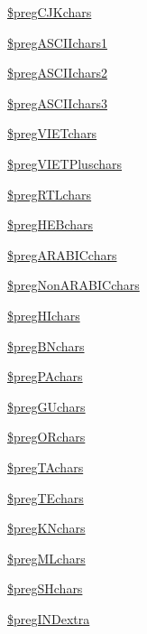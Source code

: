 \begin{DoxyCompactItemize}
\hyperlink{classm_p_d_f_ac612de0a9e3f753e072071b59564060c}{\$preg\-C\-J\-Kchars}
\item 
\hyperlink{classm_p_d_f_a505f6fdb4b2f3dd7b58fc97984fcf07e}{\$preg\-A\-S\-C\-I\-Ichars1}
\item 
\hyperlink{classm_p_d_f_ad6433b4ca18a546f1fc8b81b45e59f52}{\$preg\-A\-S\-C\-I\-Ichars2}
\item 
\hyperlink{classm_p_d_f_a6da10b526a0e13ce3439bac166fce23c}{\$preg\-A\-S\-C\-I\-Ichars3}
\item 
\hyperlink{classm_p_d_f_a6cf318b7bec85d2268f09fbd4222e107}{\$preg\-V\-I\-E\-Tchars}
\item 
\hyperlink{classm_p_d_f_a38bf80eadb48fa7ea55028c20def3a29}{\$preg\-V\-I\-E\-T\-Pluschars}
\item 
\hyperlink{classm_p_d_f_a26f3647a0abacee981fb62e9facd8f63}{\$preg\-R\-T\-Lchars}
\item 
\hyperlink{classm_p_d_f_ac0df801bf2bcd915649927ceb8107a61}{\$preg\-H\-E\-Bchars}
\item 
\hyperlink{classm_p_d_f_a33b7687be7b2c5ed6ce5f3d09b0d6605}{\$preg\-A\-R\-A\-B\-I\-Cchars}
\item 
\hyperlink{classm_p_d_f_ac88b8cf03e051527ee9b078f1c66b742}{\$preg\-Non\-A\-R\-A\-B\-I\-Cchars}
\item 
\hyperlink{classm_p_d_f_ac1139bb99f29c2911398885c2863c617}{\$preg\-H\-Ichars}
\item 
\hyperlink{classm_p_d_f_a2f44162e7ffe42defce961bcc0b123bf}{\$preg\-B\-Nchars}
\item 
\hyperlink{classm_p_d_f_a425a2819ff024a0bf9fbdff363b304a3}{\$preg\-P\-Achars}
\item 
\hyperlink{classm_p_d_f_a70f64f140b2fc02e53950923fcff1f91}{\$preg\-G\-Uchars}
\item 
\hyperlink{classm_p_d_f_ae856de52b390e162207559a30fa50524}{\$preg\-O\-Rchars}
\item 
\hyperlink{classm_p_d_f_aedb71aee8f2e2e74a16615aa91ac1204}{\$preg\-T\-Achars}
\item 
\hyperlink{classm_p_d_f_a3d53257c814bfa7a79dfd65e8c55d7c4}{\$preg\-T\-Echars}
\item 
\hyperlink{classm_p_d_f_a2b37008e281828997aaa6fb1593b63db}{\$preg\-K\-Nchars}
\item 
\hyperlink{classm_p_d_f_a2a83d5eb58c105e5d89ff9203619141e}{\$preg\-M\-Lchars}
\item 
\hyperlink{classm_p_d_f_a254e9184d07dc33a7dc682d0cd4de53a}{\$preg\-S\-Hchars}
\item 
\hyperlink{classm_p_d_f_a06968b70c36e9084ad9d6b47e9093c79}{\$preg\-I\-N\-Dextra}

\end{DoxyCompactItemize}
